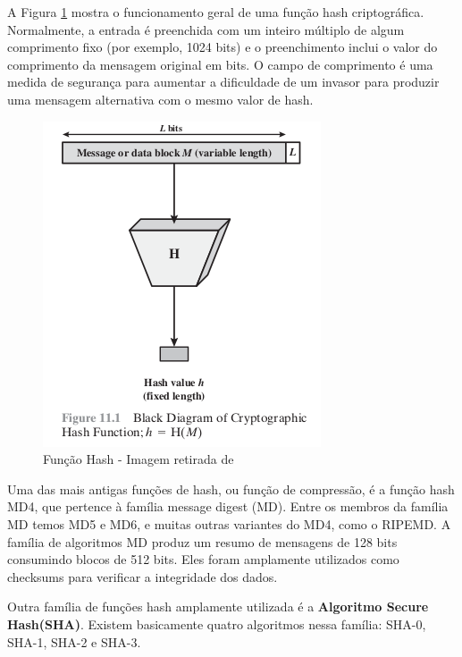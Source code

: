         A Figura \ref{fig:hash_function} mostra o funcionamento geral de uma função hash criptográfica. Normalmente, a entrada é preenchida com um inteiro múltiplo de algum comprimento fixo (por exemplo, 1024 bits) e o preenchimento inclui o valor do comprimento da mensagem original em bits. O campo de comprimento é uma medida de segurança para aumentar a dificuldade de um invasor para produzir uma mensagem alternativa com o mesmo valor de hash.\cite{cryptograpy_and_network_stallings}
    
                \begin{figure}[H]
                     \centering
                     \includegraphics[scale=0.5]{figuras/capitulo_2/hash_function.png}
                     \caption{Função Hash - Imagem retirada de \cite{cryptograpy_and_network_stallings}}
                     \label{fig:hash_function}
                \end{figure}
                
        Uma das mais antigas funções de hash, ou função de compressão, é a função hash MD4, que pertence à família message digest (MD). Entre os membros da família MD temos MD5 e MD6, e muitas outras variantes do MD4, como o RIPEMD. A família de algoritmos MD produz um resumo de mensagens de 128 bits consumindo blocos de 512 bits. Eles foram amplamente utilizados como checksums para verificar a integridade dos dados.\cite{beginnig_blockchain_bikramaditya}
        
        Outra família de funções hash amplamente utilizada é a \textbf{Algoritmo Secure Hash(SHA)}. Existem basicamente quatro algoritmos nessa família: SHA-0, SHA-1, SHA-2 e SHA-3. \cite{beginnig_blockchain_bikramaditya}

